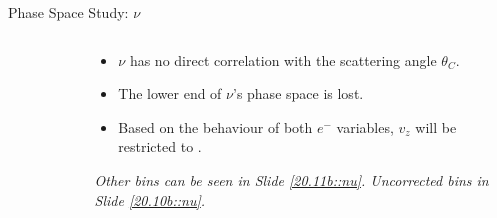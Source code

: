 \begin{frame}{Phase Space Study: $\nu$}
    \label{12.13::nu}

    \begin{columns}[onlytextwidth,T]

    \begin{column}{.48\linewidth}
        \vspace{-15pt}
        \begin{center}
            \begin{figure}[t]
            \end{figure}
        \end{center}
    \end{column}

    \begin{column}{.50\linewidth}
        \begin{itemize}
            \item
                $\nu$ has no direct correlation with the scattering angle $\theta_C$.

            \vspace{12pt}
            \item
                 The lower end of $\nu$'s phase space is lost.

            \vspace{12pt}
            \item
                Based on the behaviour of both $e^-$ variables, $v_z$ will be restricted to .
        \end{itemize}

        \vspace{72pt}

        \begin{flushright}
            \tiny{\textit{
                Other bins can be seen in Slide \textcolor{efd_purple}{\ref{20.11b::nu}}.
                Uncorrected bins in Slide \textcolor{efd_purple}{\ref{20.10b::nu}}.
            }}
        \end{flushright}
    \end{column}

    \end{columns}
\end{frame}

